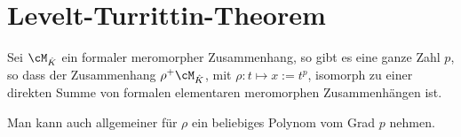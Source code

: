 \section{Levelt-\!Turrittin-\!Theorem}
\begin{comment}
Das Levelt-Turrittin-Theorem ist ein Satz, der hilft, meromorphe Zusammenhänge
in ihre irreduziblen Komponenten zu zerlegen.
\end{comment}

\begin{thm}
\label{thm:LT}
Sei $\cM_{\hat K}$ ein formaler meromorpher Zusammenhang, so gibt es eine
ganze Zahl $p$, so dass der Zusammenhang $\rho^+\cM_{\hat K}$, mit
$\rho:t\mapsto x:=t^p$, isomorph zu einer direkten Summe von formalen
elementaren meromorphen Zusammenhängen ist.
\begin{comment}
\cite[Thm 5.4.7]{sabbah_cimpa90}
\end{comment}
\end{thm}
\begin{bem}
Man kann auch allgemeiner für $\rho$ ein beliebiges Polynom vom Grad $p$
nehmen.
\end{bem}
\begin{comment}
Der folgende Beweis stammt hauptsächlich aus \cite[Seite 35]{sabbah_cimpa90}.
\end{comment}
